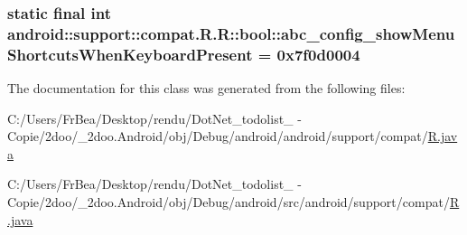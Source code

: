 \hypertarget{classandroid_1_1support_1_1compat_1_1_r_1_1bool_c3a3300fbd75272ad1d466c264cb7713}{
\subsubsection[{abc\_\-config\_\-showMenuShortcutsWhenKeyboardPresent}]{\setlength{\rightskip}{0pt plus 5cm}static final int android::support::compat.R.R::bool::abc\_\-config\_\-showMenuShortcutsWhenKeyboardPresent = 0x7f0d0004}}
\label{classandroid_1_1support_1_1compat_1_1_r_1_1bool_c3a3300fbd75272ad1d466c264cb7713}




The documentation for this class was generated from the following files:\begin{CompactItemize}
\item 
C:/Users/FrBea/Desktop/rendu/DotNet\_\-todolist\_ - Copie/2doo/\_\-2doo.Android/obj/Debug/android/android/support/compat/\hyperlink{android_2support_2compat_2_r_8java}{R.java}\item 
C:/Users/FrBea/Desktop/rendu/DotNet\_\-todolist\_ - Copie/2doo/\_\-2doo.Android/obj/Debug/android/src/android/support/compat/\hyperlink{src_2android_2support_2compat_2_r_8java}{R.java}\end{CompactItemize}
